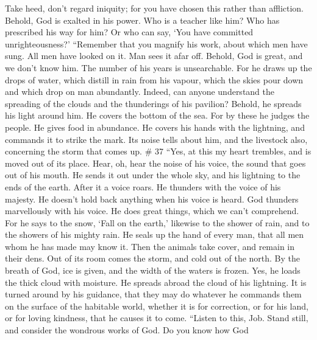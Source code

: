  Take heed, don't regard iniquity; for you have chosen
this rather than affliction.  Behold, God is exalted in
his power. Who is a teacher like him?  Who has prescribed
his way for him? Or who can say, `You have committed unrighteousness?'
 ``Remember that you magnify his work, about which men
have sung.  All men have looked on it. Man sees it afar
off.  Behold, God is great, and we don't know him. The
number of his years is unsearchable.  For he draws up the
drops of water, which distill in rain from his vapour, 
which the skies pour down and which drop on man abundantly.
 Indeed, can anyone understand the spreading of the
clouds and the thunderings of his pavilion?  Behold, he
spreads his light around him. He covers the bottom of the sea.
 For by these he judges the people. He gives food in
abundance.  He covers his hands with the lightning, and
commands it to strike the mark.  Its noise tells about
him, and the livestock also, concerning the storm that comes up. \# 37
 ``Yes, at this my heart trembles, and is moved out of its
place.  Hear, oh, hear the noise of his voice, the sound
that goes out of his mouth.  He sends it out under the
whole sky, and his lightning to the ends of the earth. 
After it a voice roars. He thunders with the voice of his majesty. He
doesn't hold back anything when his voice is heard.  God
thunders marvellously with his voice. He does great things, which we
can't comprehend.  For he says to the snow, `Fall on the
earth,' likewise to the shower of rain, and to the showers of his mighty
rain.  He seals up the hand of every man, that all men
whom he has made may know it.  Then the animals take
cover, and remain in their dens.  Out of its room comes
the storm, and cold out of the north.  By the breath of
God, ice is given, and the width of the waters is frozen.
 Yes, he loads the thick cloud with moisture. He spreads
abroad the cloud of his lightning.  It is turned around
by his guidance, that they may do whatever he commands them on the
surface of the habitable world,  whether it is for
correction, or for his land, or for loving kindness, that he causes it
to come.  ``Listen to this, Job. Stand still, and
consider the wondrous works of God.  Do you know how God
